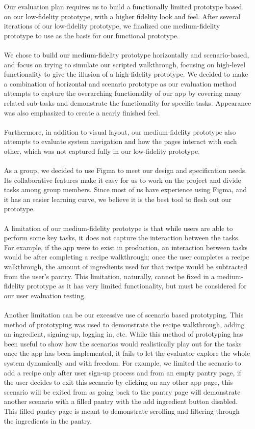 \documentclass[manuscript, screen, nonacm]{acmart}
\begin{document}
Our evaluation plan requires us to build a functionally limited prototype based on our low-fidelity prototype, with a higher fidelity look and feel. After several iterations of our low-fidelity prototype, we finalized one medium-fidelity prototype to use as the basis for our functional prototype.
\\\\We chose to build our medium-fidelity prototype horizontally and scenario-based, and focus on trying to simulate our scripted walkthrough, focusing on high-level functionality to give the illusion of a high-fidelity prototype. We decided to make a combination of horizontal and scenario prototype as our evaluation method attempts to capture the overarching functionality of our app by covering many related sub-tasks and demonstrate the functionality for specific tasks. Appearance was also emphasized to create a nearly finished feel. 
\\\\Furthermore, in addition to visual layout, our medium-fidelity prototype also attempts to evaluate system navigation and how the pages interact with each other, which was not captured fully in our low-fidelity prototype.
\\\\As a group, we decided to use Figma to meet our design and specification needs. Its collaborative features make it easy for us to work on the project and divide tasks among group members. Since most of us have experience using Figma, and it has an easier learning curve, we believe it is the best tool to flesh out our prototype.
\\\\A limitation of our medium-fidelity prototype is that while users are able to perform some key tasks, it does not capture the interaction between the tasks. For example, if the app were to exist in production, an interaction between tasks would be after completing a recipe walkthrough; once the user completes a recipe walkthrough, the amount of ingredients used for that recipe would be subtracted from the user’s pantry. This limitation, naturally, cannot be fixed in a medium-fidelity prototype as it has very limited functionality, but must be considered for our user evaluation testing. 
\\\\Another limitation can be our excessive use of scenario based prototyping. This method of prototyping was used to demonstrate the recipe walkthrough, adding an ingredient, signing-up, logging in, etc. While this method of prototyping has been useful to show how the scenarios would realistically play out for the tasks once the app has been implemented, it fails to let the evaluator explore the whole system dynamically and with freedom. For example, we limited the scenario to add a recipe only after user sign-up process and from an empty pantry page, if the user decides to exit this scenario by clicking on any other app page, this scenario will be exited from as going back to the pantry page will demonstrate another scenario with a filled pantry with the add ingredient button disabled. This filled pantry page is meant to demonstrate scrolling and filtering through the ingredients in the pantry.
\end{document}
